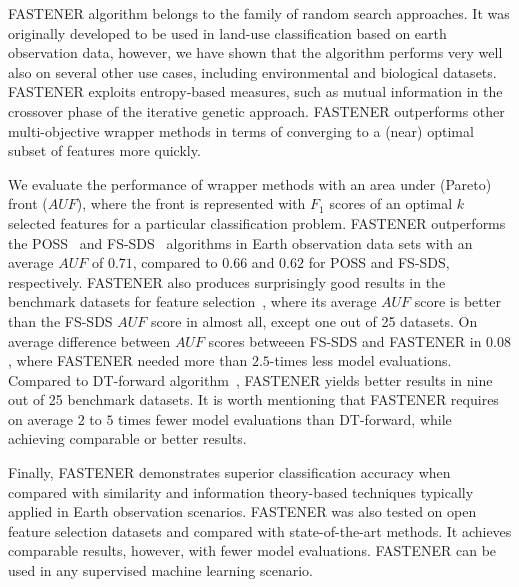 FASTENER algorithm belongs to the family of random search approaches.
It was originally developed to be used in land-use classification based on earth observation data, however, we have shown that the algorithm performs very well also on several other use cases, including environmental and biological datasets.
FASTENER exploits entropy-based measures, such as mutual information in the crossover phase of the iterative genetic approach. 
FASTENER outperforms other multi-objective wrapper methods in terms of converging to a (near) optimal subset of features more quickly.

We evaluate the performance of wrapper methods with an area under (Pareto) front ($\textit{AUF}$), where the front is represented with $F_1$ scores of an optimal $k$ selected features for a particular classification problem.
FASTENER outperforms the POSS~\cite{qian:2015:poss} and FS-SDS~\cite{alhakbani:2017:fs-sds} algorithms in Earth observation data sets with an average $\textit{AUF}$ of $0.71$, compared to $0.66$ and $0.62$ for POSS and FS-SDS, respectively.
FASTENER also produces surprisingly good results in the benchmark datasets for feature selection~\cite{li:2017:feature}, where its average $\textit{AUF}$ score is better than the FS-SDS $\textit{AUF}$ score in almost all, except one out of 25 datasets.
On average difference between $\textit{AUF}$ scores betweeen FS-SDS and FASTENER in $0.08$, where FASTENER needed more than $2.5$-times less model evaluations.
Compared to DT-forward algorithm~\cite{guyon:2003:dt-forward}, FASTENER yields better results in nine out of 25 benchmark datasets.
It is worth mentioning that FASTENER requires on average $2$ to $5$ times fewer model evaluations than DT-forward, while achieving comparable or better results.

Finally, FASTENER demonstrates superior classification accuracy when compared with similarity and information theory-based techniques typically applied in Earth observation scenarios.
FASTENER was also tested on open feature selection datasets and compared with state-of-the-art methods. 
It achieves comparable results, however, with fewer model evaluations.
FASTENER can be used in any supervised machine learning scenario.


